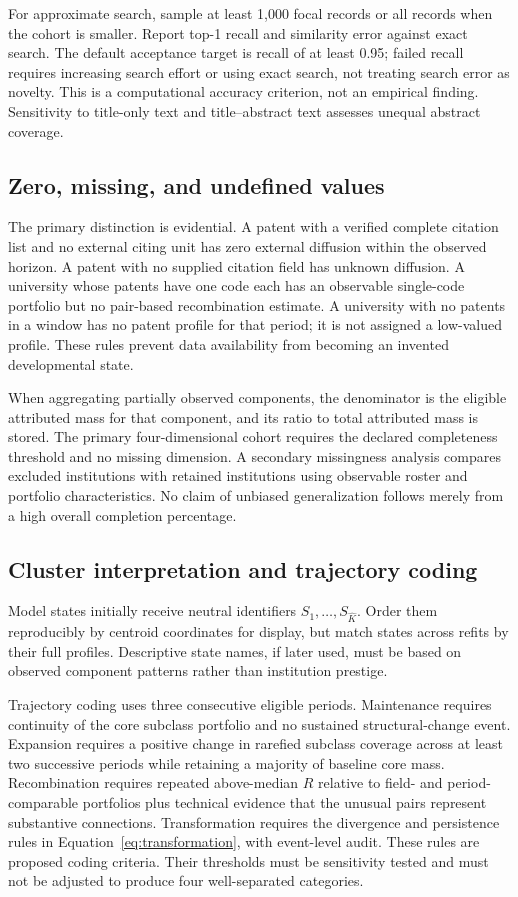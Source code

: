 For approximate search, sample at least 1,000 focal records or all records when
the cohort is smaller. Report top-1 recall and similarity error against exact
search. The default acceptance target is recall of at least 0.95; failed recall
requires increasing search effort or using exact search, not treating search
error as novelty. This is a computational accuracy criterion, not an empirical
finding. Sensitivity to title-only text and title--abstract text assesses unequal
abstract coverage.

\subsection{Zero, missing, and undefined values}
The primary distinction is evidential. A patent with a verified complete citation
list and no external citing unit has zero external diffusion within the observed
horizon. A patent with no supplied citation field has unknown diffusion.
A university whose patents have one code each has an observable single-code
portfolio but no pair-based recombination estimate. A university with no patents
in a window has no patent profile for that period; it is not assigned a low-valued
profile. These rules prevent data availability from becoming an invented
developmental state.

When aggregating partially observed components, the denominator is the eligible
attributed mass for that component, and its ratio to total attributed mass is
stored. The primary four-dimensional cohort requires the declared completeness
threshold and no missing dimension. A secondary missingness analysis compares
excluded institutions with retained institutions using observable roster and
portfolio characteristics. No claim of unbiased generalization follows merely
from a high overall completion percentage.

\subsection{Cluster interpretation and trajectory coding}
Model states initially receive neutral identifiers $S_1,\ldots,S_{\widehat K}$.
Order them reproducibly by centroid coordinates for display, but match states
across refits by their full profiles. Descriptive state names, if later used,
must be based on observed component patterns rather than institution prestige.

Trajectory coding uses three consecutive eligible periods. Maintenance requires
continuity of the core subclass portfolio and no sustained structural-change
event. Expansion requires a positive change in rarefied subclass coverage across
at least two successive periods while retaining a majority of baseline core
mass. Recombination requires repeated above-median $R$ relative to field- and
period-comparable portfolios plus technical evidence that the unusual pairs
represent substantive connections. Transformation requires the divergence and
persistence rules in Equation~\eqref{eq:transformation}, with event-level audit.
These rules are proposed coding criteria. Their thresholds must be sensitivity
tested and must not be adjusted to produce four well-separated categories.

